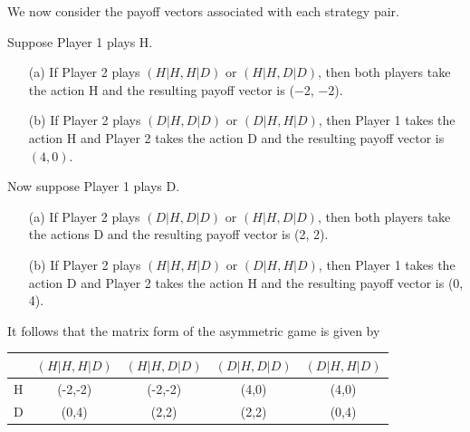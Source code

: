\documentclass[]{report}
\begin{document}
We now consider the payoff vectors associated with each strategy
pair.
\begin{framed}
\noindent Suppose Player 1 plays H.
\begin{itemize}
	\item[(a)] If Player 2 plays $(H|H, H|D)$ or $(H|H, D|D)$, then both players
take the action H and the resulting payoff vector is (−2, −2).
	\item[(b)] If Player 2 plays $(D|H, D|D)$ or $(D|H, H|D)$, then Player 1
takes the action H and Player 2 takes the action D and the
resulting payoff vector is $(4, 0)$.
\end{itemize}
\end{framed}

Now suppose Player 1 plays D.
\begin{itemize}
	\item[(a)] If Player 2 plays $(D|H, D|D)$ or $(H|H, D|D)$, then both players
	take the actions D and the resulting payoff vector is (2, 2).
	\item[(b)] If Player 2 plays $(H|H, H|D)$ or $(D|H, H|D)$, then Player 1 takes
	the action D and Player 2 takes the action H and the resulting
	payoff vector is (0, 4).
\end{itemize}

It follows that the matrix form of the asymmetric game is given by

\begin{center}
\begin{tabular}{|c|c|c|c|c|} \hline
  & $(H|H, H|D)$ & $(H|H, D|D)$ & $(D|H, D|D)$ & $(D|H, H|D)$\\ \hline
H & (-2,-2) & (-2,-2)& (4,0) & (4,0)\\ \hline
D & (0,4) & (2,2) & (2,2) & (0,4)\\ \hline
\end{tabular}
\end{center}

\end{document}

